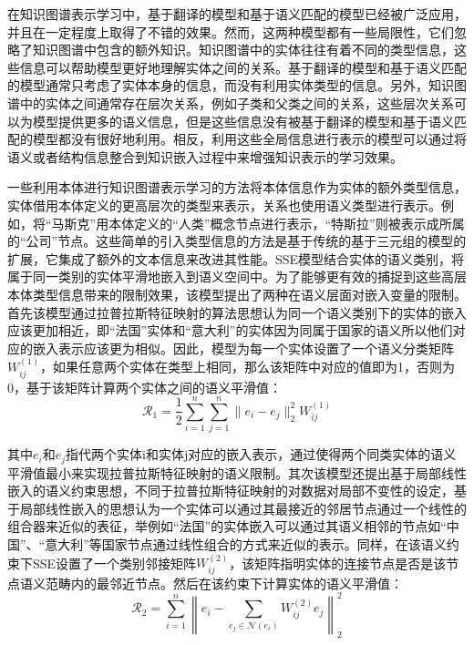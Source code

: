 在知识图谱表示学习中，基于翻译的模型和基于语义匹配的模型已经被广泛应用，并且在一定程度上取得了不错的效果。然而，这两种模型都有一些局限性，它们忽略了知识图谱中包含的额外知识。知识图谱中的实体往往有着不同的类型信息，这些信息可以帮助模型更好地理解实体之间的关系。基于翻译的模型和基于语义匹配的模型通常只考虑了实体本身的信息，而没有利用实体类型的信息。另外，知识图谱中的实体之间通常存在层次关系，例如子类和父类之间的关系，这些层次关系可以为模型提供更多的语义信息，但是这些信息没有被基于翻译的模型和基于语义匹配的模型都没有很好地利用。相反，利用这些全局信息进行表示的模型可以通过将语义或者结构信息整合到知识嵌入过程中来增强知识表示的学习效果。

一些利用本体进行知识图谱表示学习的方法将本体信息作为实体的额外类型信息，实体借用本体定义的更高层次的类型来表示，关系也使用语义类型进行表示。例如，将“马斯克”用本体定义的“人类”概念节点进行表示，“特斯拉”则被表示成所属的“公司”节点。这些简单的引入类型信息的方法是基于传统的基于三元组的模型的扩展，它集成了额外的文本信息来改进其性能。SSE\cite{guo2016sse}模型结合实体的语义类别，将属于同一类别的实体平滑地嵌入到语义空间中。为了能够更有效的捕捉到这些高层本体类型信息带来的限制效果，该模型提出了两种在语义层面对嵌入变量的限制。首先该模型通过拉普拉斯特征映射的算法思想认为同一个语义类别下的实体的嵌入应该更加相近，即“法国”实体和“意大利”的实体因为同属于国家的语义所以他们对应的嵌入表示应该更为相似。因此，模型为每一个实体设置了一个语义分类矩阵\(W^{(1)}_{ij}\)，如果任意两个实体在类型上相同，那么该矩阵中对应的值即为1，否则为0，基于该矩阵计算两个实体之间的语义平滑值：
\begin{equation}
  \mathcal{R}_{1} = \frac{1}{2} \sum_{i=1}^{n} \sum_{j=1}^{n} \| e_{i} - e_{j} \|_{2}^{2}W^{(1)}_{ij} \label{eq:2-1}
\end{equation}

其中\(e_{i}\)和\(e_{j}\)指代两个实体i和实体j对应的嵌入表示，通过使得两个同类实体的语义平滑值最小来实现拉普拉斯特征映射的语义限制。其次该模型还提出基于局部线性嵌入的语义约束思想，不同于拉普拉斯特征映射的对数据对局部不变性的设定，基于局部线性嵌入的思想认为一个实体可以通过其最接近的邻居节点通过一个线性的组合器来近似的表征，举例如“法国”的实体嵌入可以通过其语义相邻的节点如“中国”、“意大利”等国家节点通过线性组合的方式来近似的表示。同样，在该语义约束下SSE设置了一个类别邻接矩阵\(W^{(2)}_{ij}\)，该矩阵指明实体的连接节点是否是该节点语义范畴内的最邻近节点。然后在该约束下计算实体的语义平滑值：
\begin{equation}
  \mathcal{R}_{2} = \sum_{i=1}^{n} \left\| e_{i} - \sum_{e_{j}\in\mathcal{N}(e_{i})}W^{(2)}_{ij}e_{j} \right\|_{2}^{2} \label{eq:2-2}
\end{equation}

